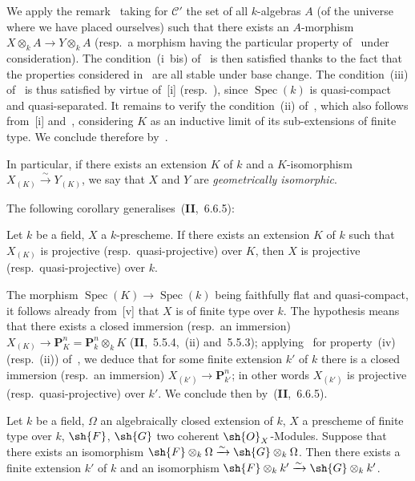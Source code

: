 We apply the remark~ taking for $\mathcal{C}'$ the set of all $k$-algebras $A$ (of the universe where we have placed ourselves) such that there exists an $A$-morphism $X\otimes_k A\to Y\otimes_k A$ (resp.\ a morphism having the particular property of~ under consideration).
The condition~(i~bis) of~ is then satisfied thanks to the fact that the
properties considered in~ are all stable under base change.
The condition~(iii) of~ is thus satisfied by virtue of~[i] (resp.\ ), since $\operatorname{Spec}(k)$ is quasi-compact and quasi-separated.
It remains to verify the condition~(ii) of~, which also follows from~[i] and~, considering $K$ as an inductive limit of its sub-extensions of finite type.
We conclude therefore by~.

In particular, if there exists an extension $K$ of $k$ and a $K$-isomorphism $X_{(K)}\xrightarrow{\sim} Y_{(K)}$, we say that $X$ and $Y$ are \emph{geometrically isomorphic}.

The following corollary generalises~(\textbf{II},~6.6.5):

\begin{corollary}[9.1.5]
\label{IV.9.1.5}
Let $k$ be a field, $X$ a $k$-prescheme.
If there exists an extension $K$ of $k$ such that $X_{(K)}$ is projective \textnormal{(}resp.\ quasi-projective\textnormal{)} over $K$, then $X$ is projective \textnormal{(}resp.\ quasi-projective\textnormal{)} over $k$.
\end{corollary}

The morphism $\operatorname{Spec}(K)\to\operatorname{Spec}(k)$ being faithfully flat and quasi-compact, it follows already from~[v] that $X$ is of finite type over $k$.
The hypothesis means that there exists a closed immersion (resp.\ an immersion) $X_{(K)}\to\mathbf{P}_K^n=\mathbf{P}_k^n\otimes_k K$ (\textbf{II},~5.5.4,~(ii) and~5.5.3); applying~ for property~(iv) (resp.~(ii)) of~, we deduce that for some finite extension $k'$ of $k$ there is a closed immersion (resp.\ an immersion) $X_{(k')}\to\mathbf{P}_{k'}^n$; in other words $X_{(k')}$ is projective (resp.\ quasi-projective) over $k'$.
We conclude then by~(\textbf{II},~6.6.5).

\begin{proposition}[9.1.6]
\label{IV.9.1.6}
Let $k$ be a field, $\Omega$ an algebraically closed extension of $k$, $X$ a prescheme of finite type over $k$, $\sh{F}$, $\sh{G}$ two coherent $\sh{O}_X$-Modules.
Suppose that there exists an isomorphism $\sh{F}\otimes_k\Omega\xrightarrow{\sim}\sh{G}\otimes_k\Omega$.
Then there exists a finite extension $k'$ of $k$ and an isomorphism $\sh{F}\otimes_k k'\xrightarrow{\sim}\sh{G}\otimes_k k'$.
\end{proposition}


